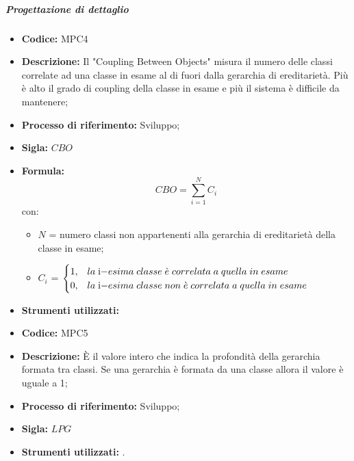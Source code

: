 \subparagraph{Progettazione di dettaglio}
    \begin{itemize}
        \item \textbf{Codice:} MPC4
        \item \textbf{Descrizione:} Il "Coupling Between Objects" misura il numero delle classi correlate ad una classe in esame al di fuori dalla gerarchia di ereditarietà. Più è alto il grado di coupling della classe in esame e più il sistema è difficile da mantenere;
        \item \textbf{Processo di riferimento:} Sviluppo;
        \item \textbf{Sigla:} $CBO$
        \item \textbf{Formula:} $$CBO = {\sum_{i=1}^{N} C_i}$$
        con:
        \begin{itemize}
            \item $N$ = numero classi non appartenenti alla gerarchia di ereditarietà della classe in esame;
            \item $C_i$ =
            \begin{math} {
                \begin{cases}
                    1, & la \; $i$-esima \; classe \; \grave{e} \; correlata \; a \; quella \; in \; esame \\
                    0, & la \; $i$-esima \; classe \; non \; \grave{e} \; correlata \; a \; quella \; in \; esame
                \end{cases}
            }
            \end{math}
        \end{itemize}
        \item \textbf{Strumenti utilizzati:}
    \end{itemize}

    \begin{itemize}
        \item \textbf{Codice:} MPC5
        \item \textbf{Descrizione:} È il valore intero che indica la profondità della gerarchia formata tra classi. Se una gerarchia è formata da una classe allora il valore è uguale a 1;
        \item \textbf{Processo di riferimento:} Sviluppo;
        \item \textbf{Sigla:} $LPG$
        \item \textbf{Strumenti utilizzati:} .
    \end{itemize}

